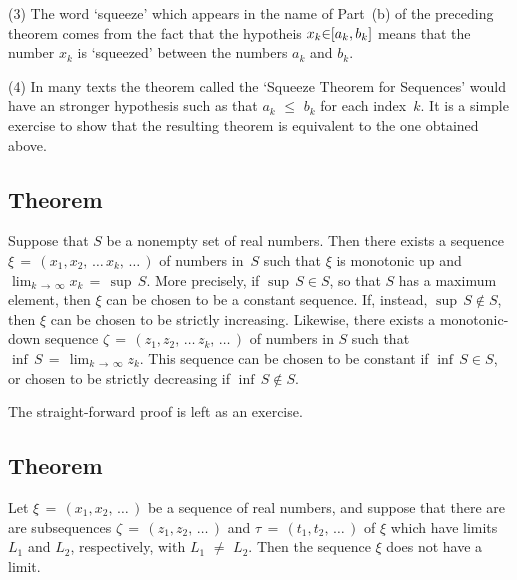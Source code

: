 \V

        (3) The word `squeeze' which appears in the name of Part~(b) of the preceding theorem comes from the fact that the hypotheis
    $x_{k}{\in}\mbox[a_{k},b_{k}]$ means that the number $x_{k}$ is `squeezed' between the numbers $a_{k}$ and $b_{k}$.

\V


        (4) In many texts the theorem called the `Squeeze Theorem for Sequences' would have an stronger hypothesis such as that $a_{k}\,\,{\leq}\,\,b_{k}$ for each index~$k$.
    It is a simple exercise to show that the resulting theorem is equivalent to the one obtained above. %

\VV

            \subsection{\small{\bf Theorem}}
            \label{ThmC20.25}

\V

        Suppose that $S$ be a nonempty set of real numbers. Then there exists a sequence
    ${\xi} \,=\, (x_{1},x_{2},\,{\ldots}\,x_{k},\,{\ldots}\,)$ of numbers in~$S$ such that
    ${\xi}$ is monotonic up and $\lim_{k \,{\rightarrow}\, {\infty}} x_{k} \,=\, {\sup}\,S$.
    More precisely, if ${\sup}\,S{\in}S$, so that $S$ has a maximum element, then ${\xi}$ can be chosen to be a constant sequence.
    If, instead, ${\sup}\,S\not \in S$, then ${\xi}$ can be chosen to be strictly increasing.
    Likewise, there exists a monotonic-down sequence ${\zeta} \,=\, (z_{1}, z_{2},\,{\ldots}\,z_{k},\,{\ldots}\,)$
    of numbers in $S$ such that ${\inf}\,S \,=\, \lim_{k \,{\rightarrow}\, {\infty}} z_{k}$.
    This sequence can be chosen to be constant if ${\inf}\,S{\in}S$, or chosen to be strictly decreasing if ${\inf}\,S\not \in S$.

\V

        The straight-forward proof is left as an exercise. %


\VV

            \subsection{\small{\bf Theorem}}
            \label{ThmC20.30}

        Let ${\xi} \,=\, (x_{1},x_{2},\,{\ldots}\,)$ be a sequence of real numbers,
    and suppose that there are are subsequences ${\zeta} \,=\, (z_{1},z_{2},\,{\ldots}\,)$ and ${\tau} \,=\, (t_{1},t_{2},\,{\ldots}\,)$ of ${\xi}$ which have limits $L_{1}$ and $L_{2}$, respectively, with $L_{1} \,\,{\neq}\,\, L_{2}$.
    Then the sequence ${\xi}$ does not have a limit.

